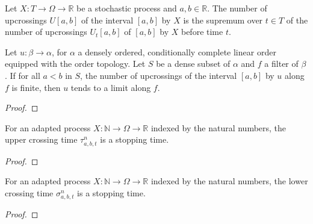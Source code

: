 \begin{definition}[Upcrossings]\label{def:upcrossings}
  \mathlibok
Let $X : T \to \Omega \to \mathbb{R}$ be a stochastic process and $a, b \in \mathbb{R}$.
The number of upcrossings $U[a, b]$ of the interval $[a, b]$ by $X$ is the supremum over $t \in T$ of the number of upcrossings $U_t[a, b]$ of $[a, b]$ by $X$ before time $t$.
\end{definition}


\begin{lemma}\label{lem:tendsto_of_no_upcrossings}
  \mathlibok
Let $u : \beta \to \alpha$, for $\alpha$ a densely ordered, conditionally complete linear order equipped with the order topology.
Let $S$ be a dense subset of $\alpha$ and $f$ a filter of $\beta$.
If for all $a < b$ in $S$, the number of upcrossings of the interval $[a, b]$ by $u$ along $f$ is finite, then $u$ tends to a limit along $f$.
\end{lemma}

\begin{proof}\leanok

\end{proof}


\begin{lemma}\label{lem:isStoppingTime_upperCrossingTime}
For an adapted process $X : \mathbb{N} \to \Omega \to \mathbb{R}$ indexed by the natural numbers, the upper crossing time $\tau^n_{a, b, t}$ is a stopping time.
\end{lemma}

\begin{proof}

\end{proof}


\begin{lemma}\label{lem:isStoppingTime_lowerCrossingTime}
For an adapted process $X : \mathbb{N} \to \Omega \to \mathbb{R}$ indexed by the natural numbers, the lower crossing time $\sigma^n_{a, b, t}$ is a stopping time.
\end{lemma}

\begin{proof}

\end{proof}



